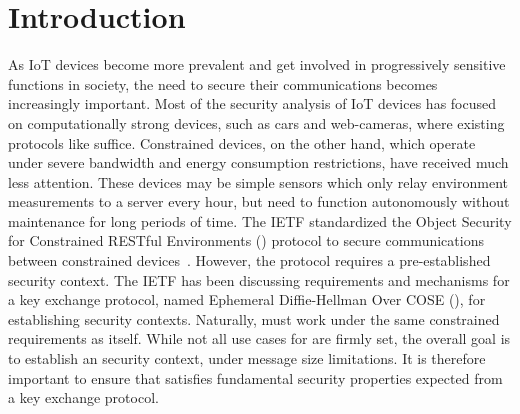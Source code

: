 \documentclass[runningheads, envcountsame, hidelinks, a4paper, draft, x11names]{llncs}
\begin{document}
\section{Introduction}
\label{sec:introduction}

As IoT devices become more prevalent and get involved in progressively sensitive
functions in society, the need to secure their communications
becomes increasingly important.
%
Most of the security analysis of IoT devices has focused on computationally
strong devices, such as cars and web-cameras, where existing protocols like
\mDandTls{} suffice.
%
Constrained devices, on the other hand, which operate under severe
bandwidth and energy consumption restrictions, have received much less
attention.
%
These devices may be simple sensors which only relay environment
measurements to a server every hour, but need to function autonomously without
maintenance for long periods of time.
%
The IETF standardized the Object Security for
Constrained RESTful Environments (\mOscore{}) protocol to secure communications
between constrained devices~\cite{rfc8613}.
%
However, the \mOscore{} protocol requires a pre-established security context.
%
The IETF has been discussing requirements and mechanisms for a key
exchange protocol, named Ephemeral Diffie-Hellman Over COSE (\mEdhoc), for
establishing \mOscore{} security contexts.
%
Naturally, \mEdhoc{} must work under the same constrained requirements as
\mOscore{} itself.
%
While not all use cases for \mEdhoc{} are firmly set, the overall goal is to
establish an \mOscore{} security context, under message size limitations.
%
It is therefore important to ensure that \mEdhoc{} satisfies fundamental
security properties expected from a key exchange protocol.
%
\end{document}

